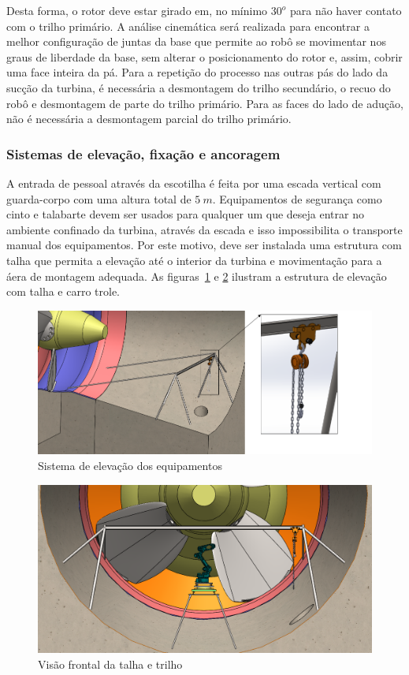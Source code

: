   Desta forma, o rotor deve estar girado em, no mínimo $30^o$ para não haver
  contato com o trilho primário. A análise cinemática será realizada para
  encontrar a melhor configuração de juntas da base que permite ao robô se
  movimentar nos graus de liberdade da base, sem alterar o posicionamento do
  rotor e, assim, cobrir uma face inteira da pá. Para a repetição do processo
  nas outras pás do lado da sucção da turbina, é necessária a desmontagem do
  trilho secundário, o recuo do robô e desmontagem de parte do trilho primário.
  Para as faces do lado de adução, não é necessária a desmontagem parcial do
  trilho primário.
  
  \subsubsection{Sistemas de elevação, fixação e ancoragem}
  A entrada de pessoal através da escotilha é feita por uma escada vertical com
  guarda-corpo com uma altura total de $5~m$. Equipamentos de segurança como
  cinto e talabarte devem ser usados para qualquer um que deseja entrar no
  ambiente confinado da turbina, através da escada e isso impossibilita o
  transporte manual dos equipamentos. Por este motivo, deve ser instalada uma
  estrutura com talha que permita a elevação até o interior da turbina e
  movimentação para a áera de montagem adequada. As figuras~\ref{fig::talha} e
  \ref{fig::talha_trilho} ilustram a estrutura de elevação com talha e carro
  trole. 
  
\begin{figure}[h!]
   \centering
   \includegraphics[width=0.8\columnwidth]{figs/bases/talha}
   \caption{Sistema de elevação dos equipamentos}
   \label{fig::talha}
\end{figure}

\begin{figure}[h!]
   \centering
   \includegraphics[width=0.8\columnwidth]{figs/bases/talha_trilho}
   \caption{Visão frontal da talha e trilho}
   \label{fig::talha_trilho}
\end{figure}

